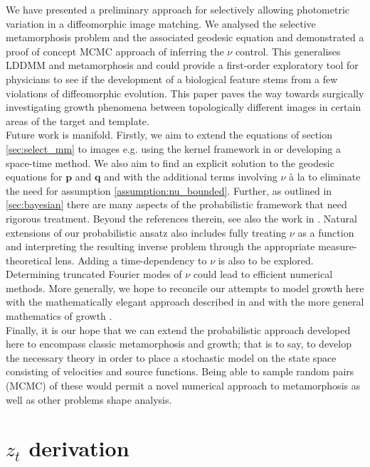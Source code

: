 \documentclass[runningheads]{llncs}
\begin{document}
We have presented a preliminary approach for selectively allowing photometric
variation in a diffeomorphic image matching. We analysed the selective
metamorphosis problem and the associated geodesic equation and demonstrated a
proof of concept MCMC approach of inferring the $\nu$ control. This generalises
LDDMM and metamorphosis and could provide a first-order exploratory tool for
physicians to see if the development of a biological feature stems from a few
violations of diffeomorphic evolution. This paper paves the way towards
surgically investigating growth phenomena between topologically different images
in certain areas of the target and template.\\

Future work is manifold. Firstly, we aim to extend the equations of section
\ref{sec:select_mm} to images e.g. using the kernel framework in
\cite{richardson2016metamorphosis} or developing a space-time method. We also
aim to find an explicit solution to the geodesic equations for $\mathbf p$ and
$\mathbf q$ and with the additional terms involving $\nu$ à la
\cite{trouve2005local} to eliminate the need for assumption
\ref{assumption:nu_bounded}.  Further, as outlined in \ref{sec:bayesian} there
are many aspects of the probabilistic framework that need rigorous treatment.
Beyond the references therein, see also the work in \cite{dashti2013map}.
Natural extensions of our probabilistic ansatz also includes fully treating
$\nu$ as a function and interpreting the resulting inverse problem through the
appropriate measure-theoretical lens. Adding a time-dependency to $\nu$ is also
to be explored. Determining truncated Fourier modes of $\nu$ could lead to
efficient numerical methods. More generally, we hope to reconcile our attempts
to model growth here with the mathematically elegant approach described
in \cite{kaltenmark2016geometrical} and with the more general mathematics of
growth \cite{goriely2017mathematics}.\\

Finally, it is our hope that we can extend the probabilistic approach developed
here to encompass classic metamorphosis and growth; that is to say, to develop
the necessary theory in order to place a stochastic model on the state space
consisting of velocities and source functions. Being able to sample random pairs
(MCMC) of these would permit a novel numerical approach to metamorphosis as well
as other problems shape analysis.

\appendix
\iffalse
\section{$z_t$ derivation}\label{app:z_derivation}
\end{document}

